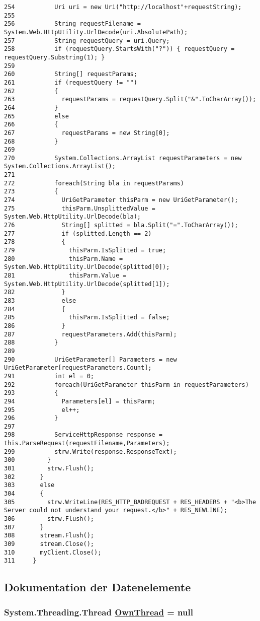 \begin{verbatim}
254           Uri uri = new Uri("http://localhost"+requestString);
255 
256           String requestFilename = System.Web.HttpUtility.UrlDecode(uri.AbsolutePath);
257           String requestQuery = uri.Query;
258           if (requestQuery.StartsWith("?")) { requestQuery = requestQuery.Substring(1); }
259 
260           String[] requestParams;
261           if (requestQuery != "") 
262           { 
263             requestParams = requestQuery.Split("&".ToCharArray());
264           } 
265           else 
266           {
267             requestParams = new String[0];
268           }
269 
270           System.Collections.ArrayList requestParameters = new System.Collections.ArrayList();
271 
272           foreach(String bla in requestParams)
273           {
274             UriGetParameter thisParm = new UriGetParameter();
275             thisParm.UnsplittedValue = System.Web.HttpUtility.UrlDecode(bla);
276             String[] splitted = bla.Split("=".ToCharArray());
277             if (splitted.Length == 2)
278             {
279               thisParm.IsSplitted = true;
280               thisParm.Name = System.Web.HttpUtility.UrlDecode(splitted[0]);
281               thisParm.Value = System.Web.HttpUtility.UrlDecode(splitted[1]);
282             } 
283             else 
284             {
285               thisParm.IsSplitted = false;
286             }
287             requestParameters.Add(thisParm);
288           }
289           
290           UriGetParameter[] Parameters = new UriGetParameter[requestParameters.Count];
291           int el = 0;
292           foreach(UriGetParameter thisParm in requestParameters)
293           {
294             Parameters[el] = thisParm;
295             el++;
296           }
297 
298           ServiceHttpResponse response = this.ParseRequest(requestFilename,Parameters);
299           strw.Write(response.ResponseText);
300         }
301         strw.Flush();
302       } 
303       else  
304       {
305         strw.WriteLine(RES_HTTP_BADREQUEST + RES_HEADERS + "<b>The Server could not understand your request.</b>" + RES_NEWLINE);
306         strw.Flush();
307       }
308       stream.Flush();
309       stream.Close();
310       myClient.Close();
311     }
\end{verbatim}\normalsize 


\subsection{Dokumentation der Datenelemente}
\hypertarget{classQbeSAS_1_1HttpService_QbeSAS_1_1HttpServicer18}{
\subsubsection[OwnThread]{\setlength{\rightskip}{0pt plus 5cm}System.Threading.Thread \hyperlink{classQbeSAS_1_1HttpService_QbeSAS_1_1HttpServicer18}{Own\-Thread} = null}}
\label{classQbeSAS_1_1HttpService_QbeSAS_1_1HttpServicer18}




